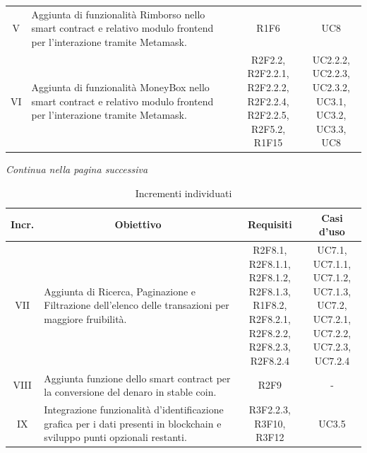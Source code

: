 \begin{table}[H]
\begin{tabular}{c|p{6cm}|c|c}
    V	& Aggiunta di funzionalità Rimborso nello smart contract\glo{} e relativo modulo frontend\glo{} per l'interazione tramite Metamask\glo{}. & R1F6 & UC8 \\
    VI & Aggiunta di funzionalità MoneyBox\glo{} nello smart contract\glo{} e relativo modulo frontend\glo{} per l'interazione tramite Metamask\glo{}. & \Shortunderstack{R2F2.2, R2F2.2.1,\\R2F2.2.2, R2F2.2.4,\\R2F2.2.5, R2F5.2,\\R1F15\\} & \Shortunderstack{UC2.2.2, UC2.2.3,\\UC2.3.2, UC3.1,\\UC3.2, UC3.3,\\UC8\\}\\
  \end{tabular}
\end{table}
\begin{center}
  \textit{\small Continua nella pagina successiva}
\end{center}
\begin{table}[H]
  \centering
  \renewcommand{\arraystretch}{1.8}
  \begin{tabular}{c|p{6cm}|c|c}
    \rowcolor[HTML]{125E28}
    \color[HTML]{FFFFFF}\textbf{Incr.}
    & \multicolumn{1}{c}{\color[HTML]{FFFFFF}\textbf{Obiettivo}}
    & \multicolumn{1}{c}{\color[HTML]{FFFFFF}\textbf{Requisiti}}
    & \multicolumn{1}{c}{\color[HTML]{FFFFFF}\textbf{Casi d'uso}}\\
    \hline
    VII	& Aggiunta di Ricerca, Paginazione e Filtrazione dell'elenco delle transazioni per maggiore fruibilità. & \Shortunderstack{R2F8.1, R2F8.1.1,\\R2F8.1.2, R2F8.1.3,\\R1F8.2, R2F8.2.1,\\R2F8.2.2, R2F8.2.3,\\R2F8.2.4\\} & \Shortunderstack{UC7.1, UC7.1.1,\\UC7.1.2, UC7.1.3,\\UC7.2, UC7.2.1,\\UC7.2.2, UC7.2.3,\\UC7.2.4\\} \\
    VIII & Aggiunta funzione dello smart contract\glo{} per la conversione del denaro in stable coin\glo{}. & R2F9 & - \\
    IX & Integrazione funzionalità d'identificazione grafica per i dati presenti in blockchain\glo{} e sviluppo punti opzionali restanti. & \Shortunderstack{R3F2.2.3, R3F10,\\R3F12\\} & UC3.5 \\
  \end{tabular}
  \caption{Incrementi individuati}
\end{table}